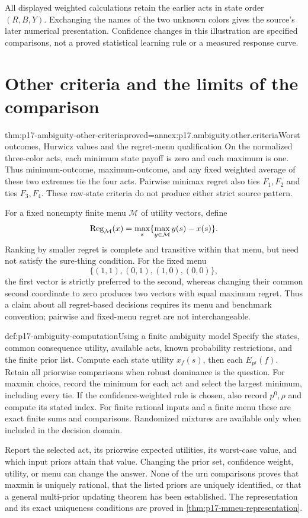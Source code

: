 All displayed weighted calculations retain the earlier acts
in state order \((R,B,Y)\). Exchanging the names of the two
unknown colors gives the source's later numerical presentation.
Confidence changes in this
illustration are specified comparisons, not a proved statistical
learning rule or a measured response curve.

\section{Other criteria and the limits of the comparison}

\begin{hbtheorem}{thm:p17-ambiguity-other-criteria}{proved=annex:p17.ambiguity.other.criteria}{Worst outcomes, Hurwicz values and the regret-menu qualification}
On the normalized three-color acts, each minimum state payoff
is zero and each maximum is one. Thus minimum-outcome,
maximum-outcome, and any fixed weighted average of these
two extremes tie the four acts. Pairwise minimax regret
also ties \(F_1,F_2\) and ties \(F_3,F_4\).
These raw-state criteria do not produce either strict source pattern.

For a fixed nonempty finite menu \(\mathcal M\) of utility vectors, define
\[
        {\rm Reg}_{\mathcal M}(x)
                 =\max_s\{\max_{y\in\mathcal M}y(s)-x(s)\}.
\]
Ranking by smaller regret is complete and transitive within
that menu, but need not satisfy the sure-thing condition.
For the fixed menu
\[
        \{(1,1),(0,1),(1,0),(0,0)\},
\]
the first vector is strictly preferred to the second,
whereas changing their common second coordinate to zero
produces two vectors with equal maximum regret.
Thus a claim about all regret-based decisions requires its
menu and benchmark convention; pairwise and fixed-menu
regret are not interchangeable.
\end{hbtheorem}

\begin{hbmethod}{def:p17-ambiguity-computation}{Using a finite ambiguity model}
Specify the states, common consequence utility, available acts,
known probability restrictions, and the finite prior list.
Compute each state utility \(x_f(s)\), then each \(E_{p^j}(f)\).
Retain all priorwise comparisons when robust dominance is the
question. For maxmin choice, record the minimum for each act
and select the largest minimum, including every tie.
If the confidence-weighted rule is chosen, also record
\(p^0,\rho\) and compute its stated index.
For finite rational inputs and a finite menu these are exact
finite sums and comparisons. Randomized mixtures are available
only when included in the decision domain.

Report the selected act, its priorwise expected utilities,
its worst-case value, and which input priors attain that value.
Changing the prior set, confidence weight, utility, or menu
can change the answer. None of the urn comparisons proves that
maxmin is uniquely rational, that the listed priors are uniquely
identified, or that a general multi-prior updating theorem has been
established. The representation and its exact uniqueness conditions
are proved in \cref{thm:p17-mmeu-representation}.
\end{hbmethod}
